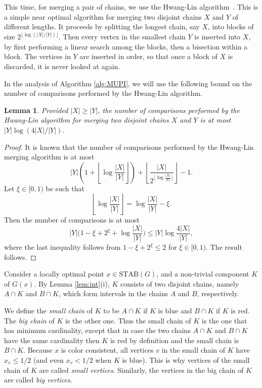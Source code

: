 \documentclass{article} \usepackage{fullpage}
\newtheorem{lemma}{Lemma}
\newcommand{\STAB}{\mathrm{STAB}}
\begin{document}
This time, for merging a pair of chains, we use the Hwang-Lin algorithm~\cite{HL72}. This is a simple near optimal algorithm for merging two disjoint chains $X$ and $Y$ of different lengths. It proceeds by splitting the longest chain, say $X$, into blocks of size $2^{\lfloor \log (|X|/|Y|)\rfloor}$. Then every vertex in the smallest chain $Y$ is inserted into $X$, by first performing a linear search among the blocks, then a bisection within a block. The vertices in $Y$ are inserted in order, so that once a block of $X$ is discarded, it is never looked at again.

In the analysis of Algorithm \ref{alg:MUPI}, we will use the following bound on the number of comparisons performed by the Hwang-Lin algorithm.

\begin{lemma}
\label{lem:HL_bound}
Provided $|X| \geq |Y|$, the number of comparisons performed by the Hwang-Lin algorithm for merging two disjoint chains $X$ and $Y$ is at most $|Y| \log (4|X|/|Y|)$.
\end{lemma}
\begin{proof}
It is known \cite{HL72} that the number of comparisons performed by the Hwang-Lin merging algorithm is at most
$$
|Y| \left(1 + \left\lfloor \log \frac{|X|}{|Y|} \right\rfloor\right) + \left\lfloor \frac{|X|}{2^{\lfloor \log \frac{|X|}{|Y|} \rfloor}} \right\rfloor - 1.
$$
Let $\xi \in [0,1)$ be such that
$$
\left\lfloor \log \frac{|X|}{|Y|} \right\rfloor = \log \frac{|X|}{|Y|} - \xi.
$$
Then the number of comparisons is at most
$$
|Y| \Big(1-\xi+2^\xi + \log \frac{|X|}{|Y|}\Big) \leq |Y| \log\frac{4|X|}{|Y|},
$$
where the last inequality follows from $1-\xi+2^\xi \leq 2$ for $\xi \in [0,1)$. The result follows.
\end{proof}

Consider a locally optimal point $x \in \STAB(G)$, and a non-trivial component $K$ of $G(x)$. By Lemma \ref{lem:int}(i), $K$ consists of two disjoint chains, namely $A \cap K$ and $B \cap K$, which form intervals in the  chains $A$ and $B$, respectively. 

We define the {\sl small chain\/} of $K$ to be $A \cap K$ if $K$ is blue and $B \cap K$ if $K$ is red. The {\sl big chain} of $K$ is the other one. Thus the small chain of $K$ is the one that has minimum cardinality, except that in case the two chains $A \cap K$ and $B \cap K$ have the same cardinality then $K$ is red by definition and the small chain is $B \cap K$. Because $x$ is color consistent, all vertices $v$ in the small chain of $K$ have $x_v \leq 1/2$ (and even $x_v < 1/2$ when $K$ is blue). This is why vertices of the small chain of $K$ are called {\sl small vertices}. Similarly, the vertices in the big chain of $K$ are called {\sl big vertices}.
\end{document}
